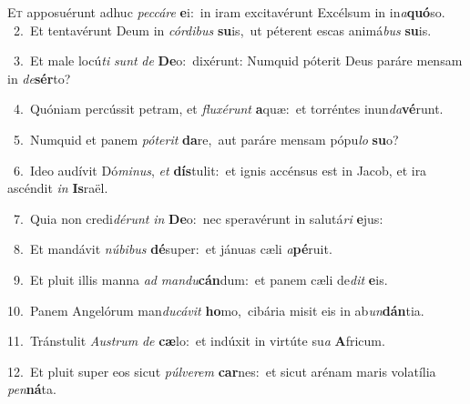 \lettrine{\initial\textcolor{\initialcolor}{E}}{t} apposuérunt adhuc \textit{pec}\-\textit{cá}\textit{re} \textbf{e}\-i:~\star in iram excitavérunt Excélsum in in\-\textit{a}\-\textbf{quó}so.\\
{\numbfont\textcolor{\numbcolor}{~2.}}~Et tentavérunt Deum in \textit{cór}\-\textit{di}\textit{bus} \textbf{su}\-is,~\star ut péterent escas animá\textit{bus} \textbf{su}\-is.\par
{\numbfont\textcolor{\numbcolor}{~3.}}~Et male locú\textit{ti} \textit{sunt} \textit{de} \textbf{De}\-o:~\star dixérunt: Numquid póterit Deus paráre mensam in \textit{de}\-\textbf{sér}to?\par
{\numbfont\textcolor{\numbcolor}{~4.}}~Quóniam percússit petram, et \textit{flu}\-\textit{xé}\textit{runt} \textbf{a}\-quæ:~\star et torréntes inun\-\textit{da}\-\textbf{vé}runt.\par
{\numbfont\textcolor{\numbcolor}{~5.}}~Numquid et panem \textit{pót}\-\textit{e}\textit{rit} \textbf{da}\-re,~\star aut paráre mensam pópu\textit{lo} \textbf{su}\-o?\par
{\numbfont\textcolor{\numbcolor}{~6.}}~Ideo audívit Dó\-\textit{mi}\-\textit{nus}, \textit{et} \textbf{dís}\-tulit:~\star et ignis accénsus est in Jacob, et ira ascéndit \textit{in} \textbf{Is}\-raël.\par
{\numbfont\textcolor{\numbcolor}{~7.}}~Quia non credi\-\textit{dé}\-\textit{runt} \textit{in} \textbf{De}\-o:~\star nec speravérunt in salutá\textit{ri} \textbf{e}\-jus:\par
{\numbfont\textcolor{\numbcolor}{~8.}}~Et mandávit \textit{nú}\-\textit{bi}\textit{bus} \textbf{dé}\-super:~\star et jánuas cæli \textit{a}\-\textbf{pé}ruit.\par
{\numbfont\textcolor{\numbcolor}{~9.}}~Et pluit illis manna \textit{ad} \textit{man}\-\textit{du}\textbf{cán}dum:~\star et panem cæli de\textit{dit} \textbf{e}\-is.\par
{\numbfont\textcolor{\numbcolor}{10.}}~Panem Angelórum man\-\textit{du}\-\textit{cá}\textit{vit} \textbf{ho}\-mo,~\star cibária misit eis in ab\-\textit{un}\-\textbf{dán}tia.\par
{\numbfont\textcolor{\numbcolor}{11.}}~Tránstulit \textit{Aus}\-\textit{trum} \textit{de} \textbf{cæ}\-lo:~\star et indúxit in virtúte su\textit{a} \textbf{A}\-fricum.\par
{\numbfont\textcolor{\numbcolor}{12.}}~Et pluit super eos sicut \textit{púl}\-\textit{ve}\textit{rem} \textbf{car}\-nes:~\star et sicut arénam maris volatília \textit{pen}\-\textbf{ná}ta.\par
